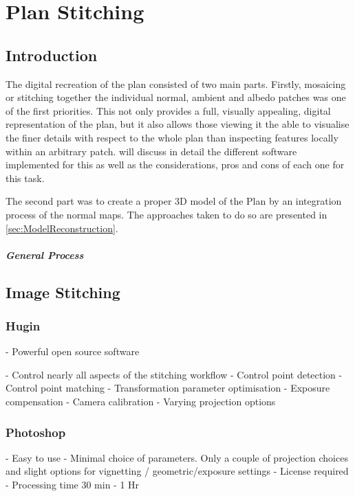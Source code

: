 
\chapter{Plan Stitching}
\label{chp:MosaicStitchingChapter}

\section{Introduction}
\label{sec:Introduction}
The digital recreation of the plan consisted of two main parts. Firstly, mosaicing or stitching together the individual normal, ambient and albedo patches was one of the first priorities. This not only provides a full, visually appealing, digital representation of the plan, but it also allows those viewing it the able to visualise the finer details with respect to the whole plan than inspecting features locally within an arbitrary patch.  will discuss in detail the different software implemented for this as well as the considerations, pros and cons of each one for this task.

The second part was to create a proper 3D model of the Plan by an integration process of the normal maps. The approaches taken to do so are presented in \cref{sec:ModelReconstruction}.

	\paragraph{General Process}

\section{Image Stitching}
\label{sec:ImageStitching}

	\subsection{Hugin}
	\label{sec:Hugin}
	- Powerful open source software
	
	- Control nearly all aspects of the stitching workflow
		- Control point detection
		- Control point matching
		- Transformation parameter optimisation
		- Exposure compensation
		- Camera calibration
		- Varying projection options

	\subsection{Photoshop}
	\label{sec:Photoshop}
	- Easy to use
	- Minimal choice of parameters. Only a couple of projection choices and slight options for vignetting / geometric/exposure settings
	- License required
	- Processing time 30 min - 1 Hr

